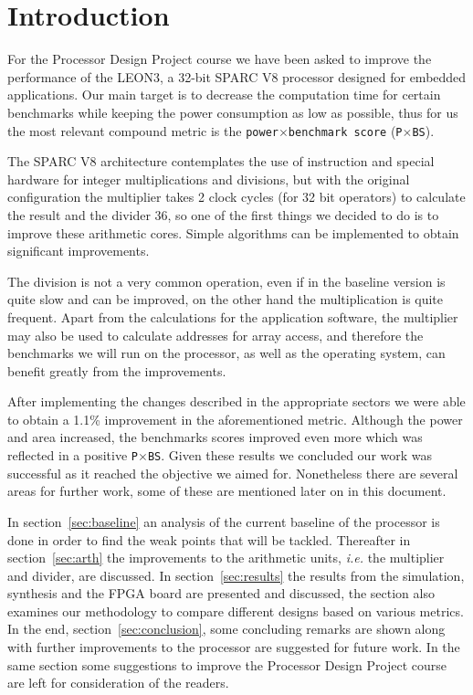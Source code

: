
\section{Introduction}

For the Processor Design Project course we have been asked to improve the performance of the
LEON3, a 32-bit SPARC V8 processor designed for embedded applications.
Our main target is to decrease the computation time for certain benchmarks while keeping the power
consumption as low as possible, thus for us the most relevant compound metric is the
\texttt{power}$\times$\texttt{benchmark score} (\texttt{P}$\times$\texttt{BS}).

The SPARC V8 architecture contemplates the use of instruction and special hardware for integer
multiplications and divisions, but with the original configuration the multiplier takes 2 clock cycles (for 32 bit operators)
to calculate the result and the divider 36, so one of the first things we decided to do is to improve
these arithmetic cores. Simple algorithms can be implemented to obtain significant improvements.

The division is not a very common operation, even if in the baseline version is quite slow and can be improved, on the other hand the multiplication is quite frequent. Apart from the calculations for the application software, the multiplier may also be used to calculate addresses for array access, and therefore the benchmarks we will run on the processor, as well as the operating system, can benefit greatly from the improvements.

After implementing the changes described in the appropriate sectors we were able to obtain a 1.1\% improvement in the aforementioned metric. Although the power and area increased, the benchmarks scores improved even more which was reflected in a positive \texttt{P$\times$BS}.
Given these results we concluded our work was successful as it reached the objective we aimed for. Nonetheless there are several areas for further work, some of these are mentioned later on in this document.


In section~\ref{sec:baseline} an analysis of the current baseline of the processor is done in order to find the weak points that will be tackled.
Thereafter in section~\ref{sec:arth} the improvements to the arithmetic units, \emph{i.e.} the multiplier and divider, are discussed.
In section~\ref{sec:results} the results from the simulation, synthesis and the FPGA board are presented and discussed, the section also examines our methodology to compare different designs based on various metrics.
In the end, section~\ref{sec:conclusion}, some concluding remarks are shown along with further improvements to the processor are suggested for future work. In the same section some suggestions to improve the Processor Design Project course are left for consideration of the readers.